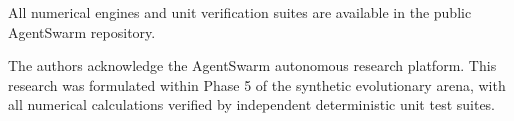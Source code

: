 \documentclass[aps,prd,twocolumn,superscriptaddress,nofootinbib,floatfix,longbibliography]{revtex4-2}
\begin{document}
All numerical engines and unit verification suites are available in the public AgentSwarm repository.

\begin{acknowledgments}
The authors acknowledge the AgentSwarm autonomous research platform. This research was formulated within Phase 5 of the synthetic evolutionary arena, with all numerical calculations verified by independent deterministic unit test suites.
\end{acknowledgments}


\end{document}
